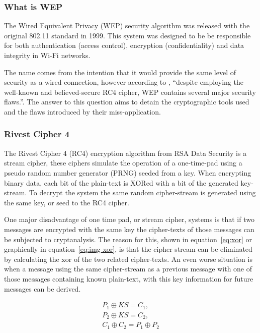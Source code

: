 \documentclass[pdftex, 12pt, a4paper]{article}
\begin{document}
\subsubsection{What is WEP}
The Wired Equivalent Privacy (WEP) security algorithm was released with the original 802.11 standard in 1999\cite{802.11}. This system was designed to be be responsible for both authentication (access control), encryption (confidentiality) and data integrity in Wi-Fi networks.

The name comes from the intention that it would provide the same level of security as a wired connection, however according to \textcite{intercepting-wifi}, ``despite employing the well-known and believed-secure RC4 cipher, WEP contains several major security flaws.''.  The answer to this question aims to detain the cryptographic tools used and the flaws introduced by their miss-application.

\subsubsection{Rivest Cipher 4}
The Rivest Cipher 4 (RC4) encryption algorithm from RSA Data Security is a stream cipher, these ciphers simulate the operation of a one-time-pad using a pseudo random number generator (PRNG) seeded from a key\cite{otp-faq}. When encrypting binary data, each bit of the plain-text is XORed with a bit of the generated key-stream. To decrypt the system the same random cipher-stream is generated using the same key, or seed to the RC4 cipher.

One major disadvantage of one time pad, or stream cipher, systems is that if two messages are encrypted with the same key the cipher-texts of those messages can be subjected to cryptanalysis.  The reason for this, shown in equation~\ref{eq:xor} or graphically in equation~\ref{eq:img-xor}, is that the cipher stream can be eliminated by calculating the xor of the two related cipher-texts. An even worse situation is when a message using the same cipher-stream as a previous message with one of those messages containing known plain-text, with this key information for future messages can be derived.

\begin{subequations}
    \begin{align}
        P_1 \oplus KS = C_1,\\
        P_2 \oplus KS = C_2,\\
        C_1 \oplus C_2 = P_1 \oplus P_2\label{eq:xor}
    \end{align}
\end{subequations}
\end{document}
